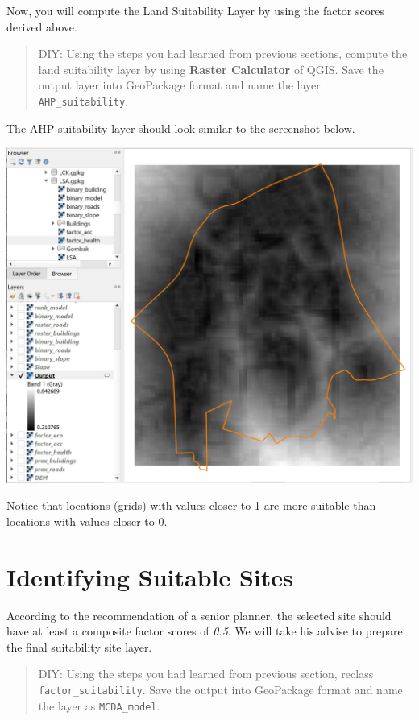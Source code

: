 \documentclass[
  letterpaper,
  DIV=11,
  numbers=noendperiod]{scrreprt}
\begin{document}
Now, you will compute the Land Suitability Layer by using the factor
scores derived above.

\begin{quote}
DIY: Using the steps you had learned from previous sections, compute the
land suitability layer by using \textbf{Raster Calculator} of QGIS. Save
the output layer into GeoPackage format and name the layer
\texttt{AHP\_suitability}.
\end{quote}

The AHP-suitability layer should look similar to the screenshot below.

\includegraphics{./img08/image19.jpg}

Notice that locations (grids) with values closer to 1 are more suitable
than locations with values closer to 0.

\hypertarget{identifying-suitable-sites}{%
\section{Identifying Suitable Sites}\label{identifying-suitable-sites}}

According to the recommendation of a senior planner, the selected site
should have at least a composite factor scores of \emph{0.5}. We will
take his advise to prepare the final suitability site layer.

\begin{quote}
DIY: Using the steps you had learned from previous section, reclass
\texttt{factor\_suitability}. Save the output into GeoPackage format and
name the layer as \texttt{MCDA\_model}.
\end{quote}
\end{document}
